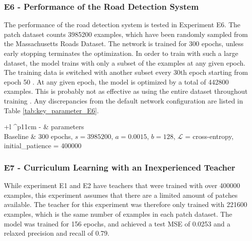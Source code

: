 \subsubsection{E6 - Performance of the Road Detection System}
The performance of the road detection system is tested in Experiment E6. The patch dataset counts 3985200 examples, which have been randomly sampled from the Massachusetts Roads Dataset. The network is trained for 300 epochs, unless early stopping terminates the optimization. In order to train with such a large dataset, the model trains with only a subset of the examples at any given epoch. The training data is switched with another subset every 30th epoch starting from epoch 50 . At any given epoch, the model is optimized by a total of 442800 examples. This is probably not as effective as using the entire dataset throughout training . Any discrepancies from the default network configuration are listed in Table \ref{tab:key_parameter_E6}.
\begin{table}[h]
\caption{Key parameters for E6.}
\begin{center}
\begin{adjustbox}{max width=\textwidth}
\begin{tabular}{+l ^p{11cm}}\hline
\rowstyle{\bfseries}
  - & parameters \\\hline
  Baseline & 300 epochs, $s=3 985 200$, $a=0.0015$, $b=128$, $\mathcal{L}$ = cross-entropy, initial\_patience = 400000  \\
  \hline
\end{tabular}
\end{adjustbox}
\end{center}
\label{tab:key_parameter_E6}
\end{table}

\subsubsection{E7 - Curriculum Learning with an Inexperienced Teacher}
While experiment E1 and E2 have teachers that were trained with over 400000 examples, this  
experiment assumes that there are a limited amount of patches available. The teacher for this experiment was therefore only trained with 221600 examples, which is the same number of examples in each patch dataset. The model was trained for 156 epochs, and achieved a test \ac{MSE} of 0.0253 and a relaxed precision and recall of 0.79.\\

